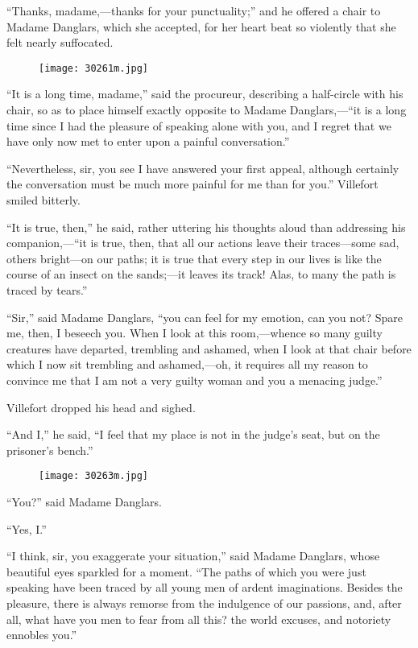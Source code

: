 “Thanks, madame,—thanks for your punctuality;” and he offered a chair
to Madame Danglars, which she accepted, for her heart beat so violently
that she felt nearly suffocated.

\begin{figure}[ht]
\texttt{[image: 30261m.jpg]}
\end{figure}

“It is a long time, madame,” said the procureur, describing a
half-circle with his chair, so as to place himself exactly opposite to
Madame Danglars,—“it is a long time since I had the pleasure of
speaking alone with you, and I regret that we have only now met to
enter upon a painful conversation.”

“Nevertheless, sir, you see I have answered your first appeal, although
certainly the conversation must be much more painful for me than for
you.” Villefort smiled bitterly.

“It is true, then,” he said, rather uttering his thoughts aloud than
addressing his companion,—“it is true, then, that all our actions leave
their traces—some sad, others bright—on our paths; it is true that
every step in our lives is like the course of an insect on the
sands;—it leaves its track! Alas, to many the path is traced by tears.”

“Sir,” said Madame Danglars, “you can feel for my emotion, can you not?
Spare me, then, I beseech you. When I look at this room,—whence so many
guilty creatures have departed, trembling and ashamed, when I look at
that chair before which I now sit trembling and ashamed,—oh, it
requires all my reason to convince me that I am not a very guilty woman
and you a menacing judge.”

Villefort dropped his head and sighed.

“And I,” he said, “I feel that my place is not in the judge’s seat, but
on the prisoner’s bench.”

\begin{figure}[ht]
\texttt{[image: 30263m.jpg]}
\end{figure}

“You?” said Madame Danglars.

“Yes, I.”

“I think, sir, you exaggerate your situation,” said Madame Danglars,
whose beautiful eyes sparkled for a moment. “The paths of which you
were just speaking have been traced by all young men of ardent
imaginations. Besides the pleasure, there is always remorse from the
indulgence of our passions, and, after all, what have you men to fear
from all this? the world excuses, and notoriety ennobles you.”

